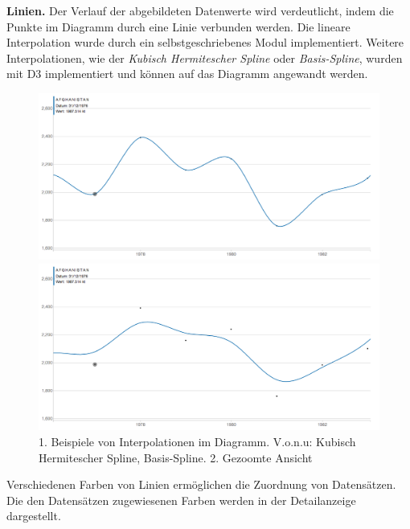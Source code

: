 \textbf{Linien.} Der Verlauf der abgebildeten Datenwerte wird verdeutlicht, indem die Punkte im Diagramm durch eine Linie verbunden werden. Die lineare Interpolation wurde durch ein selbstgeschriebenes Modul implementiert. Weitere Interpolationen, wie der \textit{Kubisch Hermitescher Spline} oder \textit{Basis-Spline}, wurden mit D3 implementiert und können auf das Diagramm angewandt werden.

\begin{figure}[!htbp]
	\begin{minipage}{\textwidth}
		\centering
		\includegraphics[width=\linewidth]{images/cardinal}
	\end{minipage}
	\begin{minipage}{\textwidth}
		\centering
		\includegraphics[width=\linewidth]{images/basis}
	\end{minipage}
	\caption[Beispiele von Interpolationen und Zoom]{1. Beispiele von Interpolationen im Diagramm. V.o.n.u: Kubisch Hermitescher Spline, Basis-Spline. 2. Gezoomte Ansicht}
	\label{fig:vergleich}
\end{figure}

Verschiedenen Farben von Linien ermöglichen die Zuordnung von Datensätzen. Die den Datensätzen zugewiesenen Farben werden in der Detailanzeige dargestellt.

